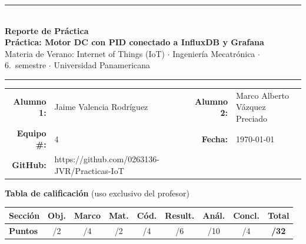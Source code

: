 \documentclass[11pt, letterpaper]{article}
\begin{document}

\begin{center}
  {\color{upBlue}\rule{\linewidth}{1.5pt}}\\[0.3cm]
  {\Large\bfseries\color{upBlue} Reporte de Pr\'actica}\\[0.2cm]
  {\large\bfseries\color{roseMain}
    Pr\'actica: Motor DC con PID conectado a InfluxDB y Grafana}\\[0.15cm]
  {\normalsize Materia de Verano: Internet of Things (IoT)
    $\cdot$ Ingenier\'ia Mecatr\'onica
    $\cdot$ 6.\textdegree\ semestre
    $\cdot$ Universidad Panamericana}\\[0.3cm]
  {\color{roseMain}\rule{\linewidth}{0.8pt}}
\end{center}

\vspace{0.3cm}

\begin{tabular}{rl rl}
  \textbf{Alumno 1:}   & Jaime Valencia Rodríguez&
  \textbf{Alumno 2:}   & Marco Alberto Vázquez Preciado\\[0.5em]
  \textbf{Equipo \#:}  & 4&
  \textbf{Fecha:}      & \today        \\[0.6em]
  \textbf{GitHub:}     & https://github.com/0263136-JVR/Practicas-IoT& & \\
\end{tabular}

\vspace{0.5cm}

\begin{mdframed}[backgroundcolor=grayLight,linecolor=grayMid,linewidth=0.5pt,
  innerleftmargin=12pt,innerrightmargin=12pt,
  innertopmargin=6pt,innerbottommargin=6pt]
  \textbf{\color{upBlue}Tabla de calificaci\'on}
  \hfill{\small\color{gray}(uso exclusivo del profesor)}\\[0.4em]
  \begin{tabular}{lcccccccc}
    \toprule
    \textbf{Secci\'on} &
    Obj. & Marco & Mat. & C\'od. & Result. & An\'al. & Concl. &
    \textbf{Total} \\
    \midrule
    \textbf{Puntos} &
    /2 & /4 & /2 & /4 & /6 & /10 & /4 & \textbf{/32} \\
    \bottomrule
  \end{tabular}
\end{mdframed}
\end{document}
